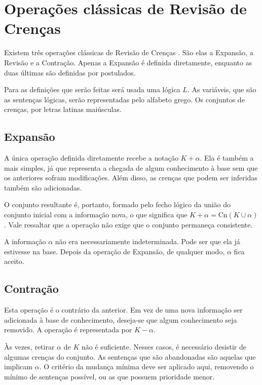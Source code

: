 \section{Operações clássicas de Revisão de Crenças}

Existem três operações clássicas de Revisão de Crenças \citep{revisaoGardenfors2}. São elas a Expansão, a Revisão e a Contração. Apenas a Expansão é definida diretamente, enquanto as duas últimas são definidas por postulados. 

Para as definições que serão feitas será usada uma lógica $ L $. As variáveis, que são as sentenças lógicas, serão representadas pelo alfabeto grego. Os conjuntos de crenças, por letras latinas maiúsculas.

\subsection{Expansão}

A única operação definida diretamente recebe a notação $ K + \alpha $. Ela é também a mais simples, já que representa a chegada de algum conhecimento à base sem que os anteriores sofram modificações. Além disso, as crenças que podem ser inferidas também são adicionadas.

O conjunto resultante é, portanto, formado pelo fecho lógico da união do conjunto inicial com a informação nova, o que significa que $ K + \alpha = \text{Cn}(K \cup \alpha) $. Vale ressaltar que a operação não exige que o conjunto permaneça consistente.

A informação $ \alpha $ não era necessariamente indeterminada. Pode ser que ela já estivesse na base. Depois da operação de Expansão, de qualquer modo, $ \alpha $ fica aceito.

\subsection{Contração}

Esta operação é o contrário da anterior. Em vez de uma nova informação ser adicionada à base de conhecimento, deseja-se que algum conhecimento seja removido. A operação é representada por $ K - \alpha $.

Às vezes, retirar $ \alpha $ de $ K $ não é suficiente. Nesses casos, é necessário desistir de algumas crenças do conjunto. As sentenças que são abandonadas são aquelas que implicam $ \alpha $. O critério da mudança mínima deve ser aplicado aqui, removendo o mínimo de sentenças possível, ou as que possuem prioridade menor.

